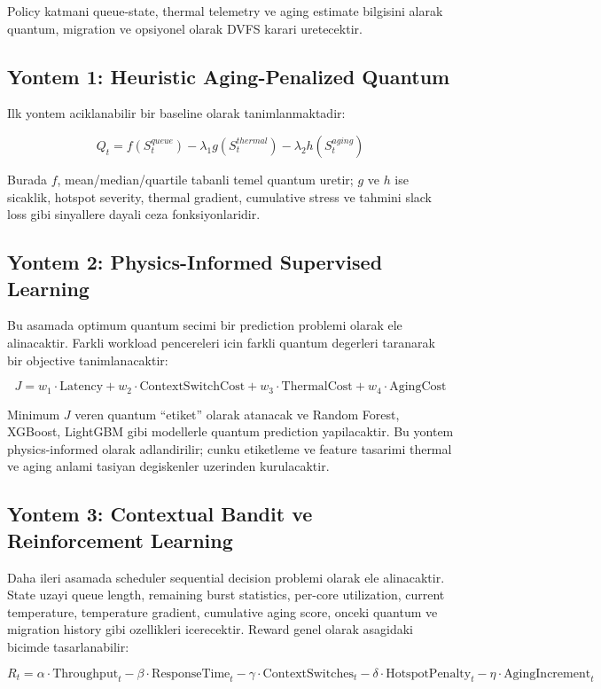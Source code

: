 \documentclass[12pt,a4paper]{article}
\begin{document}
Policy katmani queue-state, thermal telemetry ve aging estimate bilgisini alarak quantum, migration ve opsiyonel
olarak DVFS karari uretecektir.

\subsection{Yontem 1: Heuristic Aging-Penalized Quantum}

Ilk yontem aciklanabilir bir baseline olarak tanimlanmaktadir:

\[
Q_t = f(S^{queue}_t) - \lambda_1 g(S^{thermal}_t) - \lambda_2 h(S^{aging}_t)
\]

Burada $f$, mean/median/quartile tabanli temel quantum uretir; $g$ ve $h$ ise sicaklik, hotspot severity,
thermal gradient, cumulative stress ve tahmini slack loss gibi sinyallere dayali ceza fonksiyonlaridir.

\subsection{Yontem 2: Physics-Informed Supervised Learning}

Bu asamada optimum quantum secimi bir prediction problemi olarak ele alinacaktir. Farkli workload pencereleri icin
farkli quantum degerleri taranarak bir objective tanimlanacaktir:

\[
J = w_1 \cdot \text{Latency} + w_2 \cdot \text{ContextSwitchCost} + w_3 \cdot \text{ThermalCost} + w_4 \cdot \text{AgingCost}
\]

Minimum $J$ veren quantum ``etiket'' olarak atanacak ve Random Forest, XGBoost, LightGBM gibi modellerle quantum
prediction yapilacaktir. Bu yontem physics-informed olarak adlandirilir; cunku etiketleme ve feature tasarimi thermal
ve aging anlami tasiyan degiskenler uzerinden kurulacaktir.

\subsection{Yontem 3: Contextual Bandit ve Reinforcement Learning}

Daha ileri asamada scheduler sequential decision problemi olarak ele alinacaktir. State uzayi queue length,
remaining burst statistics, per-core utilization, current temperature, temperature gradient, cumulative aging score,
onceki quantum ve migration history gibi ozellikleri icerecektir. Reward genel olarak asagidaki bicimde tasarlanabilir:

\[
R_t = \alpha \cdot \text{Throughput}_t - \beta \cdot \text{ResponseTime}_t - \gamma \cdot \text{ContextSwitches}_t - \delta \cdot \text{HotspotPenalty}_t - \eta \cdot \text{AgingIncrement}_t
\]
\end{document}
